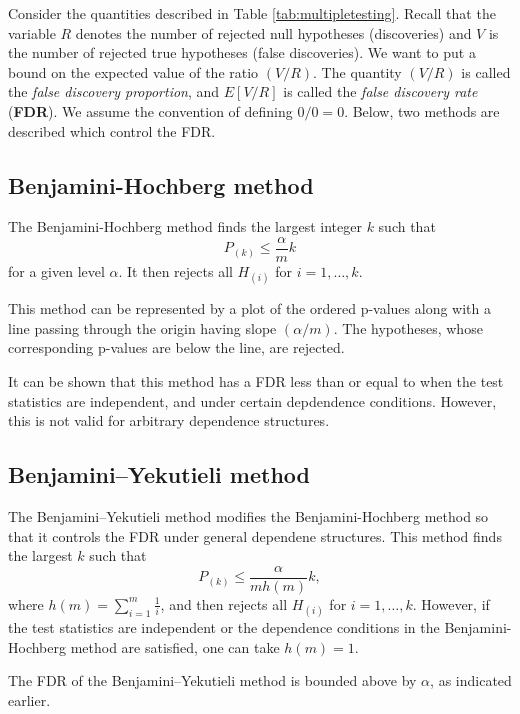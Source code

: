 \documentclass[
]{book}
\begin{document}
Consider the quantities described in Table \ref{tab:multipletesting}. Recall that the variable \(R\) denotes the number of rejected null hypotheses (discoveries) and \(V\) is the number of rejected true hypotheses (false discoveries). We want to put a bound on the expected value of the ratio \((V / R)\). The quantity \((V / R)\) is called the \emph{false discovery proportion}, and \(E[ V / R ]\) is called the \emph{false discovery rate} (\textbf{FDR}). We assume the convention of defining \(0 / 0 = 0\). Below, two methods are described which control the FDR.

\hypertarget{BH}{%
\subsection{Benjamini-Hochberg method}\label{BH}}

The Benjamini-Hochberg method \citep{benjamini1995controlling} finds the largest integer \(k\) such that \[P_{(k)} \le \frac{\alpha}{m} k\] for a given level \(\alpha\). It then rejects all \(H_{(i)}\) for \(i = 1, \ldots, k\).

This method can be represented by a plot of the ordered p-values along with a line passing through the origin having slope \((\alpha / m)\). The hypotheses, whose corresponding p-values are below the line, are rejected.

It can be shown that this method has a FDR less than or equal to \alpha when the test statistics are independent, and under certain depdendence conditions. However, this is not valid for arbitrary dependence structures.

\hypertarget{BY}{%
\subsection{Benjamini--Yekutieli method}\label{BY}}

The Benjamini--Yekutieli method \citep{benjamini2001control} modifies the Benjamini-Hochberg method so that it controls the FDR under general dependene structures. This method finds the largest \(k\) such that \[P_{(k)} \le \frac{\alpha}{m h(m)} k ,\] where \(h(m) = \sum_{i=1}^m \frac{1}{i}\), and then rejects all \(H_{(i)}\) for \(i = 1, \ldots, k\). However, if the test statistics are independent or the dependence conditions in the Benjamini-Hochberg method are satisfied, one can take \(h(m) = 1\).

The FDR of the Benjamini--Yekutieli method is bounded above by \(\alpha\), as indicated earlier.
\end{document}
